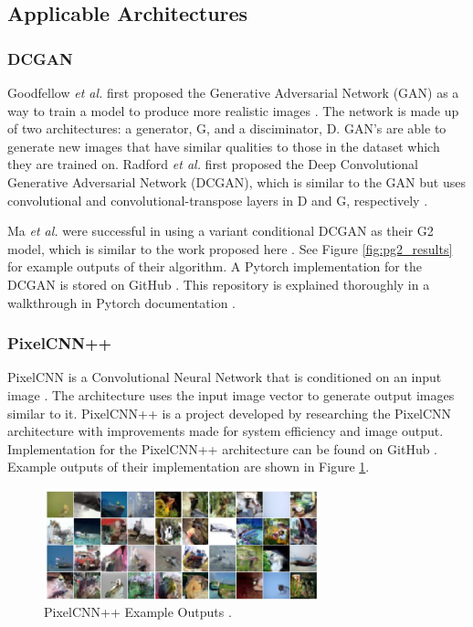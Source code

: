 \documentclass[letterpaper]{article} %
\begin{document}
\subsection{Applicable Architectures}
\subsubsection{DCGAN}
Goodfellow \textit{et al.} first proposed the Generative Adversarial Network (GAN)
as a way to train a model to produce more realistic images
\cite{generative_adversarial_networks}.
The network is made up of two architectures:
a generator, G, and a disciminator, D.
GAN's are able to generate new images that have similar qualities to
those in the dataset which they are trained on.
Radford \textit{et al.} first proposed the Deep Convolutional Generative Adversarial Network (DCGAN),
which is similar to the GAN
but uses convolutional and convolutional-transpose layers in D and G, respectively
\cite{unsupervised_learning}.

Ma \textit{et al.} were successful in using
a variant conditional DCGAN as their G2 model, which is similar to the work proposed here
\cite{pose_guided_image_generation}.
See Figure \ref{fig:pg2_results} for example outputs of their algorithm.
A Pytorch implementation for the DCGAN is stored on GitHub
\cite{dcgan_git}. This repository is explained thoroughly in a walkthrough
in Pytorch documentation \cite{dcgan_example}.

\subsubsection{PixelCNN++}
PixelCNN is a Convolutional Neural Network that is conditioned on an input image
\cite{conditional_image_generation}.
The architecture uses the input image vector to generate output images similar to it.
PixelCNN++ \cite{pixelcnn++} is a project developed by researching the
PixelCNN architecture with improvements made
for system efficiency and image output.
Implementation for the PixelCNN++ architecture can be found on GitHub \cite{pixelcnn++_git}.
Example outputs of their implementation are shown in Figure \ref{fig:pixelcnn++}.

\begin{figure}[htbp]
\centerline{\includegraphics[width=8cm]{pixelcnn++.png}}
\caption{PixelCNN++ Example Outputs \cite{pixelcnn++}.}
\label{fig:pixelcnn++}
\end{figure}
\end{document}
